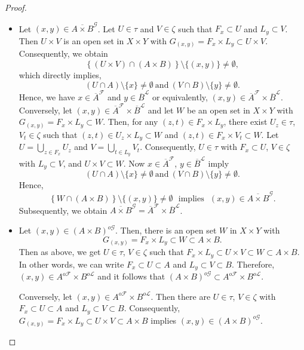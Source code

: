 \documentclass[11pt]{amsart}
\begin{document}
\begin{proof}\begin{itemize}
         \item[(i)]    Let $(x,y)\in \overline{A\times B}^{\mathcal{G}}$. Let $U\in\tau$ and $V\in \zeta$ such that $F_x\subset U$ and $L_y\subset V$. Then $U\times V$ is an open set in $X\times Y$ with $G_{(x,y)}=F_x\times L_y\subset U\times V$. Consequently, we obtain
    $$\left\{(U\times V)\cap (A\times B)\right\}\setminus \{(x,y)\}\neq \emptyset,$$
    which directly implies, $$(U\cap A)\setminus\{x\}\neq\emptyset~\text{and}~(V\cap B)\setminus\{y\}\neq \emptyset.$$
    Hence, we have $x\in \overline{A}^\mathscr{F}$ and $y\in \overline{B}^{\mathscr{L}}$ or equivalently, $(x,y)\in \overline{A}^\mathscr{F}\times \overline{B}^{\mathscr{L}}$.\\

    Conversely, let  $(x,y)\in \overline{A}^\mathscr{F}\times \overline{B}^{\mathscr{L}}$ and let $W$ be an open set in $X\times Y$ with $G_{(x,y)}=F_x\times L_y\subset W$. Then, for any $(z,t)\in F_x\times L_y$, there exist $U_z\in \tau$, $V_t\in \zeta$ such that $(z,t)\in U_z\times L_y\subset W$ and $(z,t)\in F_x\times V_t\subset W$. Let $U=\bigcup_{z\in F_x} U_z$ and $V=\bigcup_{t\in L_y} V_t$. Consequently,  $U\in \tau$ with $F_x\subset U$, $V\in \zeta$ with $L_y\subset V$, and  $U\times V\subset W$. Now $x\in \overline{A}^\mathscr{F}$, $y\in \overline{B}^{\mathscr{L}}$ imply $$(U\cap A)\setminus\{x\}\neq\emptyset~\text{and}~(V\cap B)\setminus\{y\}\neq \emptyset.$$
    Hence, $$\left\{W\cap (A\times B)\right\}\setminus \{(x,y)\}\neq \emptyset ~~~\text{implies}~~~(x,y)\in \overline{A\times B}^{\mathcal{G}}.$$ Subsequently, we obtain  $\overline{A\times B}^{\mathcal{G}}=\overline{A}^\mathscr{F}\times \overline{B}^{\mathscr{L}}$.\\
    \item[(ii)]   Let $(x,y)\in (A\times B)^{o\mathcal{G}}$. Then, there is an open set $W$ in $X\times Y$ with $$G_{(x,y)}=F_x\times L_y\subset W\subset A\times B.$$ Then as above, we get $U\in \tau$, $V\in \zeta$ such that $F_x\times L_y\subset U\times V\subset W\subset A\times B$. In other words, we can write $F_x\subset U\subset A$ and $L_y\subset V\subset B$. Therefore, $(x,y)\in A^{o\mathscr{F}}\times B^{o\mathscr{L}}$ and it follows that $(A\times B)^{o\mathcal{G}}\subset A^{o\mathscr{F}}\times B^{o\mathscr{L}}$.

    Conversely, let $(x,y)\in A^{o\mathscr{F}}\times B^{o\mathscr{L}}$. Then there are $U\in \tau$, $V\in \zeta$ with $F_x\subset U\subset A$ and $L_y\subset V\subset B$. Consequently, $G_{(x,y)}=F_x\times L_y\subset U\times V \subset A\times B$ implies $(x,y)\in (A\times B)^{o\mathcal{G}}$.
     \end{itemize}
\end{proof}
\end{document}

